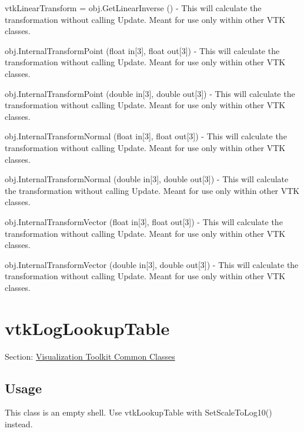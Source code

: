 \begin{DoxyItemize}
\item {\ttfamily vtk\-Linear\-Transform = obj.\-Get\-Linear\-Inverse ()} -\/ This will calculate the transformation without calling Update. Meant for use only within other V\-T\-K classes.  
\item {\ttfamily obj.\-Internal\-Transform\-Point (float in\mbox{[}3\mbox{]}, float out\mbox{[}3\mbox{]})} -\/ This will calculate the transformation without calling Update. Meant for use only within other V\-T\-K classes.  
\item {\ttfamily obj.\-Internal\-Transform\-Point (double in\mbox{[}3\mbox{]}, double out\mbox{[}3\mbox{]})} -\/ This will calculate the transformation without calling Update. Meant for use only within other V\-T\-K classes.  
\item {\ttfamily obj.\-Internal\-Transform\-Normal (float in\mbox{[}3\mbox{]}, float out\mbox{[}3\mbox{]})} -\/ This will calculate the transformation without calling Update. Meant for use only within other V\-T\-K classes.  
\item {\ttfamily obj.\-Internal\-Transform\-Normal (double in\mbox{[}3\mbox{]}, double out\mbox{[}3\mbox{]})} -\/ This will calculate the transformation without calling Update. Meant for use only within other V\-T\-K classes.  
\item {\ttfamily obj.\-Internal\-Transform\-Vector (float in\mbox{[}3\mbox{]}, float out\mbox{[}3\mbox{]})} -\/ This will calculate the transformation without calling Update. Meant for use only within other V\-T\-K classes.  
\item {\ttfamily obj.\-Internal\-Transform\-Vector (double in\mbox{[}3\mbox{]}, double out\mbox{[}3\mbox{]})} -\/ This will calculate the transformation without calling Update. Meant for use only within other V\-T\-K classes.  
\end{DoxyItemize}\hypertarget{vtkcommon_vtkloglookuptable}{}\section{vtk\-Log\-Lookup\-Table}\label{vtkcommon_vtkloglookuptable}
Section\-: \hyperlink{sec_vtkcommon}{Visualization Toolkit Common Classes} \hypertarget{vtkwidgets_vtkxyplotwidget_Usage}{}\subsection{Usage}\label{vtkwidgets_vtkxyplotwidget_Usage}
This class is an empty shell. Use vtk\-Lookup\-Table with Set\-Scale\-To\-Log10() instead.

